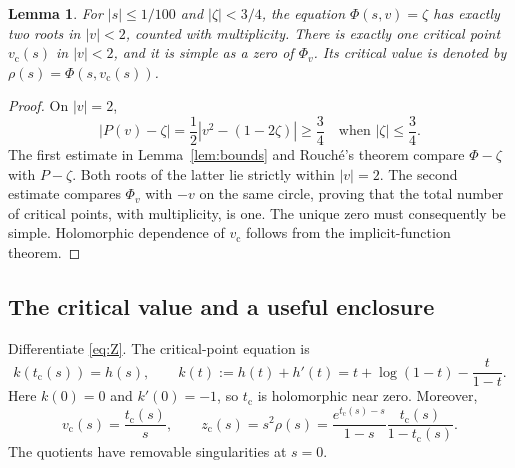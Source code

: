 \documentclass[11pt,a4paper]{article}
\newtheorem{lemma}[theorem]{Lemma}
\theoremstyle{definition}
\theoremstyle{remark}
\newcommand{\tc}{t_{\mathrm c}}
\newcommand{\zc}{z_{\mathrm c}}
\newcommand{\vc}{v_{\mathrm c}}
\begin{document}
\begin{lemma}\label{lem:two-roots}
For $|s|\le1/100$ and $|\zeta|<3/4$, the equation
$\Phi(s,v)=\zeta$ has exactly two roots in $|v|<2$, counted with
multiplicity. There is exactly one critical point $\vc(s)$ in $|v|<2$,
and it is simple as a zero of $\Phi_v$. Its critical value is denoted by
$\rho(s)=\Phi(s,\vc(s))$.
\end{lemma}
\begin{proof}
On $|v|=2$,
\[
 |P(v)-\zeta|=\frac12|v^2-(1-2\zeta)|\ge\frac34
 \quad\text{when }|\zeta|\le\frac34.
\]
The first estimate in Lemma~\ref{lem:bounds} and Rouch\'e's theorem compare
$\Phi-\zeta$ with $P-\zeta$. Both roots of the latter lie strictly within
$|v|=2$. The second estimate compares $\Phi_v$ with $-v$ on the same
circle, proving that the total number of critical points, with
multiplicity, is one. The unique zero must consequently be simple.
Holomorphic dependence of $\vc$ follows from the implicit-function theorem.
\end{proof}

\subsection{The critical value and a useful enclosure}
Differentiate \eqref{eq:Z}. The critical-point equation is
\begin{equation}\label{eq:k}
 k(\tc(s))=h(s),\qquad
 k(t):=h(t)+h'(t)=t+\log(1-t)-\frac{t}{1-t}.
\end{equation}
Here $k(0)=0$ and $k'(0)=-1$, so $\tc$ is holomorphic near zero. Moreover,
\begin{equation}\label{eq:rho-exact}
 \vc(s)=\frac{\tc(s)}s,\qquad
 \zc(s)=s^2\rho(s)=\frac{e^{\tc(s)-s}}{1-s}
                          \frac{\tc(s)}{1-\tc(s)}.
\end{equation}
The quotients have removable singularities at $s=0$.
\end{document}
